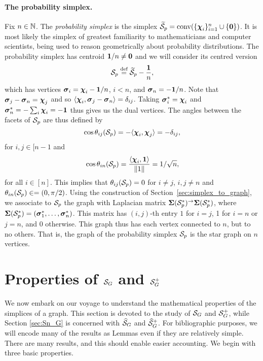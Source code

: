 \paragraph{The probability simplex.} 
Fix  $n\in\mathbb{N}$. The \emph{probability simplex} is the simplex $\widetilde{\mathcal{S}}_p=\textnormal{conv}(\{\boldsymbol{\chi}_i\}_{i=1}^n \cup \{\vb{0}\})$. It is most likely the simplex of greatest familiarity to mathematicians and computer scientists, being used to reason geometrically about probability distributions. The probability simplex has centroid $\vb{1}/n\neq\vb{0}$ and we will consider its centred version 
\[\mathcal{S}_p \overset{\text{def}}{=} \widetilde{\mathcal{S}}_p -  \frac{\vb{1}}{n},\]
which has vertices  $\vb*{\sigma}_i = \boldsymbol{\chi}_i - \vb{1}/n$, $i<n$, and $\vb*{\sigma}_n = -\vb{1}/n$. Note that $\vb*{\sigma}_j-\vb*{\sigma}_n = \boldsymbol{\chi}_j$ and so 
$\langle \boldsymbol{\chi}_i, \vb*{\sigma}_j-\vb*{\sigma}_n\rangle = \delta_{ij}$. Taking  $\vb*{\sigma}_i^* = \boldsymbol{\chi}_i$ and $\vb*{\sigma}_n^* = -\sum_i \boldsymbol{\chi}_i = -\vb{1}$ thus gives us the dual vertices. The  angles between the facets of $\mathcal{S}_p$ are thus defined by 
\begin{equation*}
\cos\theta_{ij}(\mathcal{S}_p) = - \langle \boldsymbol{\chi}_i,\boldsymbol{\chi}_j\rangle = -\delta_{ij}, 
\end{equation*}
for $i,j\in[n-1$ and 
\begin{equation*}
\cos\theta_{in}(\mathcal{S}_p) = \frac{\langle \boldsymbol{\chi}_i,\vb{1}\rangle}{\norm{1}} = 1/\sqrt{n},
\end{equation*}
for all $i\in[n]$. 
This implies  that $\theta_{ij}(\mathcal{S}_p) = 0$ for $i\neq j$, $i,j\neq n$ and $\theta_{in}(\mathcal{S}_p) \in =(0,\pi/2)$. 
Using the  construction of Section~\ref{sec:simplex_to_graph}, we  associate to $\mathcal{S}_p$ the graph with Laplacian matrix $\boldsymbol{\Sigma}(\mathcal{S}_p^*)^\to \boldsymbol{\Sigma}(\mathcal{S}_p^*)$, where $\boldsymbol{\Sigma}(\mathcal{S}_p^*)=(\vb*{\sigma}_1^*,\dots,\vb*{\sigma}_n^*)$. This matrix has $(i,j)$-th  entry $1$ for $i=j$, 1  for $i=n$ or $j=n$,  and 0 otherwise. This graph thus has each vertex connected  to $n$, but to  no others.  That  is, the graph of the probability simplex $\mathcal{S}_p$ is  the star graph on  $n$ vertices. 

 



\section{Properties of \texorpdfstring{$\mathcal{S}_G$}{the Combinatorial Simplex} and \texorpdfstring{$\mathcal{S}_G^+$}{its inverse}}
\label{sec:S_G}
We now embark on our voyage to understand the mathematical properties of the simplices of a graph. This section is devoted to the study of $\mathcal{S}_G$ and $\mathcal{S}_G^+$, while Section \ref{sec:Sn_G} is concerned with $\widehat{\mathcal{S}}_G$ and $\widehat{\mathcal{S}}_G^+$. For bibliographic purposes, we will encode many of the results as Lemmas even if they are relatively simple. There are many results, and this should enable easier accounting. We begin with three basic properties.

